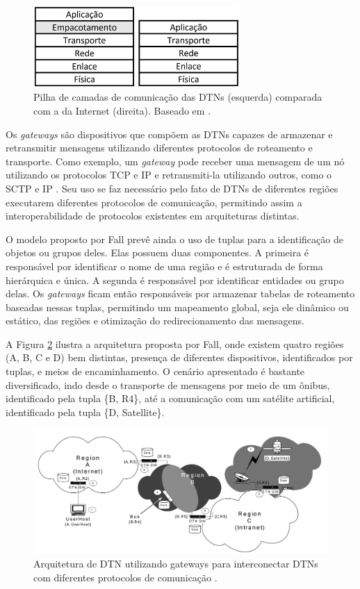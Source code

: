 \begin{figure}[htp!]
\centering
\includegraphics[width=0.7\textwidth]{figuras/cap_2/secao_1/camadas_dtn.PNG}
\caption{Pilha de camadas de comunicação das DTNs (esquerda) comparada com a da Internet (direita). Baseado em \cite{umrKehr}.}
\label{camadas_dtn}
\end{figure}

Os \emph{gateways} são dispositivos que compõem as DTNs capazes de armazenar e retransmitir mensagens utilizando diferentes protocolos de roteamento e transporte. Como exemplo, um \emph{gateway} pode receber uma mensagem de um nó utilizando os protocolos TCP e IP e retransmiti-la utilizando outros, como o SCTP e IP \cite{fall2003delay}. Seu uso se faz necessário pelo fato de DTNs de diferentes regiões executarem diferentes protocolos de comunicação, permitindo assim a interoperabilidade de protocolos existentes em arquiteturas distintas.

O modelo proposto por Fall prevê ainda o uso de tuplas para a identificação de objetos ou grupos deles. Elas possuem duas componentes. A primeira é responsável por identificar o nome de uma região e é estruturada de forma hierárquica e única. A segunda é responsável por identificar entidades ou grupo delas. Os \emph{gateways} ficam então responsáveis por armazenar tabelas de roteamento baseadas nessas tuplas, permitindo um mapeamento global, seja ele dinâmico ou estático, das regiões e otimização do redirecionamento das mensagens.

A Figura \ref{dtn_fall} ilustra a arquitetura proposta por Fall, onde existem quatro regiões (A, B, C e D) bem distintas, presença de diferentes dispositivos, identificados por tuplas, e meios de encaminhamento. O cenário apresentado é bastante diversificado, indo desde o transporte de mensagens por meio de um ônibus, identificado pela tupla \{B, R4\}, até a comunicação com um satélite artificial, identificado pela tupla \{D, Satellite\}.

\begin{figure}[htp!]
\centering
\includegraphics[width=1\textwidth]{figuras/cap_2/secao_1/dtn_fall.png}
\caption{Arquitetura de DTN utilizando gateways para interconectar DTNs com diferentes protocolos de comunicação \cite{fall2003delay}.}
\label{dtn_fall}
\end{figure}

